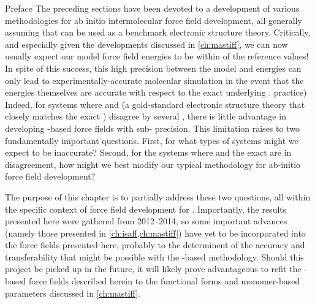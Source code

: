 \begin{section}{Preface}
The preceding sections have been devoted to a development of various methodologies for ab initio intermolecular force
field development, all generally assuming that \sapt can be used as a benchmark electronic structure
theory. Critically, and especially given the developments discussed in
\cref{ch:mastiff},
we can now usually expect our model force field energies to be within
 of the \sapt reference values! In spite of this
success, this high precision between the model
and \sapt energies can only lead to experimentally-accurate molecular
simulation in the event that the \sapt energies themselves are
accurate with respect to the exact underlying \pes. 
practice)
Indeed, for systems where \sapt
and \ccsdt (a gold-standard electronic structure theory that closely matches
the exact \pes) disagree by several
\kjmol{}, there is little advantage in developing
\sapt-based force fields with sub-\kjmol{} precision. This limitation raises to two
fundamentally important questions. 
First, for what types of systems might we expect \sapt to be inaccurate? Second,
for the systems where \sapt and the exact \pes are in disagreement, how
might we best modify our typical methodology for ab-initio force field development?

The purpose of this chapter is to partially address these two questions, all
within the specific context of force field development for \cus \mofs.
Importantly, the results presented here were gathered from 2012--2014, so some
important advances (namely those presented in \cref{ch:isaff,ch:mastiff}) have
yet to be incorporated into the force fields presented here, probably to the
determinent of the accuracy and transferability that might be possible with
the \lmoeda-based methodology.  Should this project be picked up in the
future, it will likely prove advantageous to refit the \lmoeda-based force
fields described herein to the functional forms and monomer-based parameters
discussed in \cref{ch:mastiff}.


\end{section}
